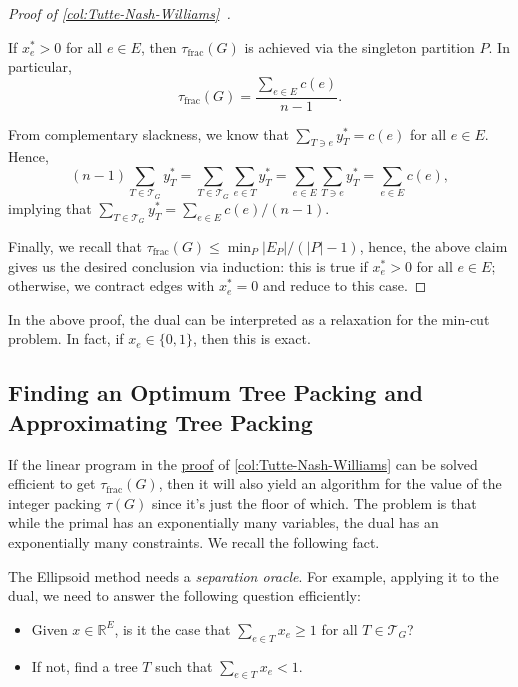 \begin{proof}[Proof of \autoref{col:Tutte-Nash-Williams}~\cite{chekuri2017near}]
	\begin{claim}
		If \(x^{\ast} _e > 0\) for all \(e \in E\), then \(\tau _{\text{frac} }(G)\) is achieved via the singleton partition \(P\). In particular,
		\[
			\tau _{\text{frac} }(G)
			= \frac{\sum_{e \in E} c(e)}{n - 1}.
		\]
	\end{claim}
	\begin{explanation}
		From complementary slackness, we know that \(\sum_{T \ni e} y^{\ast} _T = c(e)\) for all \(e\in E\). Hence,
		\[
			(n-1) \sum_{T \in \mathcal{T} _G} y^{\ast} _T
			= \sum_{T \in \mathcal{T} _G} \sum_{e \in T} y^{\ast} _T
			= \sum_{e \in E} \sum_{T \ni e} y^{\ast} _T
			= \sum_{e \in E} c(e),
		\]
		implying that \(\sum_{T \in \mathcal{T} _G} y^{\ast} _T = \sum_{e\in E} c(e) / (n-1)\).
	\end{explanation}
	Finally, we recall that \(\tau _{\text{frac} }(G) \leq \min _{P} \lvert E_P \rvert / (\lvert P \rvert - 1)\), hence, the above claim gives us the desired conclusion via induction: this is true if \(x^{\ast} _e >0\) for all \(e\in E\); otherwise, we contract edges with \(x^{\ast} _e = 0\) and reduce to this case.
\end{proof}

\begin{remark}
	In the above proof, the dual can be interpreted as a relaxation for the min-cut problem. In fact, if \(x_e \in \{ 0, 1 \} \), then this is exact.
\end{remark}

\subsection{Finding an Optimum Tree Packing and Approximating Tree Packing}
If the linear program in the \hyperref[pf:col:Tutte-Nash-Williams]{proof} of \autoref{col:Tutte-Nash-Williams} can be solved efficient to get \(\tau _{\text{frac} }(G)\), then it will also yield an algorithm for the value of the integer packing \(\tau (G)\) since it's just the floor of which. The problem is that while the primal has an exponentially many variables, the dual has an exponentially many constraints. We recall the following fact.

\begin{prev}
	The Ellipsoid method needs a \emph{separation oracle}. For example, applying it to the dual, we need to answer the following question efficiently:
	\begin{itemize}
		\item Given \(x \in \mathbb{R} ^E\), is it the case that \(\sum_{e \in T} x_e \geq 1\) for all \(T \in \mathcal{T} _G\)?
		\item If not, find a tree \(T\) such that \(\sum_{e \in T} x_e < 1\).
	\end{itemize}
\end{prev}

